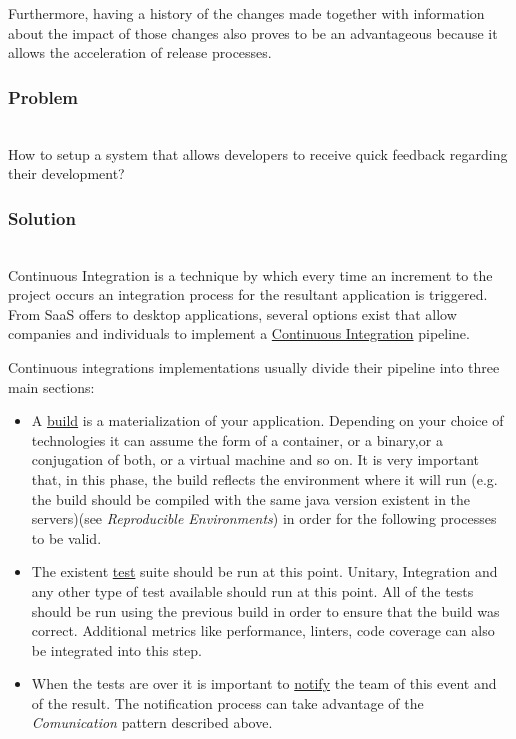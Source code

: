 \documentclass{llncs}
\begin{document}
			Furthermore, having a history of the changes made together with information about the impact of those changes also proves to be an advantageous because it allows the acceleration of release processes.
		\subsubsection{Problem}~\\

			How to setup a system that allows developers to receive quick feedback regarding their development?

		\subsubsection{Solution}~\\

      Continuous Integration is a technique by which every time an increment to the project occurs an integration process for the resultant application is triggered. From SaaS offers to desktop applications, several options exist that allow companies and individuals to implement a \underline{Continuous Integration} pipeline.

			Continuous integrations implementations usually divide their pipeline into three main sections:
			\begin{itemize}
				\item A \underline{build} is a materialization of your application. Depending on your choice of technologies it can assume the form of a container, or a binary,or a conjugation of both, or a virtual machine and so on. It is very important that, in this phase, the build reflects the environment where it will run (e.g. the build should be compiled with the same java version existent in the servers)(see \textit{Reproducible Environments}) in order for the following processes to be valid.
				\item The existent \underline{test} suite should be run at this point. Unitary, Integration and any other type of test available should run at this point. All of the tests should be run using the previous build in order to ensure that the build was correct. Additional metrics like performance, linters, code coverage can also be integrated into this step.
				\item When the tests are over it is important to \underline{notify} the team of this event and of the result. The notification process can take advantage of the \textit{Comunication} pattern described above.
			\end{itemize}
\end{document}
